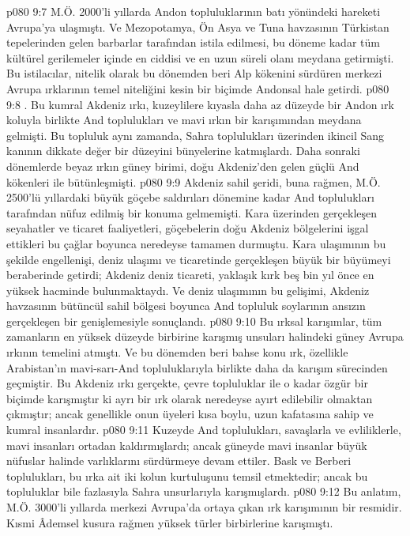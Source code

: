 \vs p080 9:7 M.Ö. 2000’li yıllarda Andon topluluklarının batı yönündeki hareketi Avrupa’ya ulaşmıştı. Ve Mezopotamya, Ön Asya ve Tuna havzasının Türkistan tepelerinden gelen barbarlar tarafından istila edilmesi, bu döneme kadar tüm kültürel gerilemeler içinde en ciddisi ve en uzun süreli olanı meydana getirmişti. Bu istilacılar, nitelik olarak bu dönemden beri Alp kökenini sürdüren merkezi Avrupa ırklarının temel niteliğini kesin bir biçimde Andonsal hale getirdi.
\vs p080 9:8 . Bu kumral Akdeniz ırkı, kuzeylilere kıyasla daha az düzeyde bir Andon ırk koluyla birlikte And toplulukları ve mavi ırkın bir karışımından meydana gelmişti. Bu topluluk aynı zamanda, Sahra toplulukları üzerinden ikincil Sang kanının dikkate değer bir düzeyini bünyelerine katmışlardı. Daha sonraki dönemlerde beyaz ırkın güney birimi, doğu Akdeniz’den gelen güçlü And kökenleri ile bütünleşmişti.
\vs p080 9:9 Akdeniz sahil şeridi, buna rağmen, M.Ö. 2500’lü yıllardaki büyük göçebe saldırıları dönemine kadar And toplulukları tarafından nüfuz edilmiş bir konuma gelmemişti. Kara üzerinden gerçekleşen seyahatler ve ticaret faaliyetleri, göçebelerin doğu Akdeniz bölgelerini işgal ettikleri bu çağlar boyunca neredeyse tamamen durmuştu. Kara ulaşımının bu şekilde engellenişi, deniz ulaşımı ve ticaretinde gerçekleşen büyük bir büyümeyi beraberinde getirdi; Akdeniz deniz ticareti, yaklaşık kırk beş bin yıl önce en yüksek hacminde bulunmaktaydı. Ve deniz ulaşımının bu gelişimi, Akdeniz havzasının bütüncül sahil bölgesi boyunca And topluluk soylarının ansızın gerçekleşen bir genişlemesiyle sonuçlandı.
\vs p080 9:10 Bu ırksal karışımlar, tüm zamanların en yüksek düzeyde birbirine karışmış unsuları halindeki güney Avrupa ırkının temelini atmıştı. Ve bu dönemden beri bahse konu ırk, özellikle Arabistan’ın mavi\hyp{}sarı\hyp{}And topluluklarıyla birlikte daha da karışım sürecinden geçmiştir. Bu Akdeniz ırkı gerçekte, çevre topluluklar ile o kadar özgür bir biçimde karışmıştır ki ayrı bir ırk olarak neredeyse ayırt edilebilir olmaktan çıkmıştır; ancak genellikle onun üyeleri kısa boylu, uzun kafatasına sahip ve kumral insanlardır.
\vs p080 9:11 Kuzeyde And toplulukları, savaşlarla ve evliliklerle, mavi insanları ortadan kaldırmışlardı; ancak güneyde mavi insanlar büyük nüfuslar halinde varlıklarını sürdürmeye devam ettiler. Bask ve Berberi toplulukları, bu ırka ait iki kolun kurtuluşunu temsil etmektedir; ancak bu topluluklar bile fazlasıyla Sahra unsurlarıyla karışmışlardı.
\vs p080 9:12 Bu anlatım, M.Ö. 3000’li yıllarda merkezi Avrupa’da ortaya çıkan ırk karışımının bir resmidir. Kısmi Âdemsel kusura rağmen yüksek türler birbirlerine karışmıştı.
